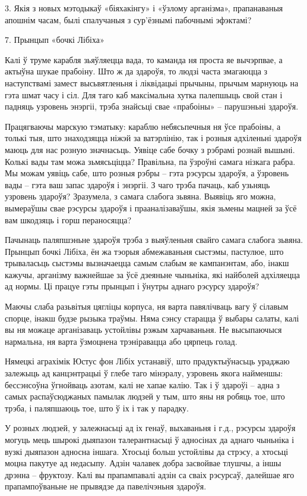 3. Якія з новых мэтодыкаў «біяхакінгу» і «ўзлому арганізма», прапанаваныя апошнім часам, былі спалучаныя з сур'ёзнымі пабочнымі эфэктамі?


7. Прынцып «бочкі Лібіха»

Калі ў труме карабля зьяўляецца вада, то каманда ня проста яе вычэрпвае, а актыўна шукае прабоіну. Што ж да здароўя, то людзі часта змагаюцца з наступствамі замест высьвятленьня і ліквідацыі прычыны, прычым марнуюць на гэта шмат часу і сіл. Для таго каб максімальна хутка палепшыць свой стан і падняць узровень энэргіі, трэба знайсьці свае «прабоіны» – парушэньні здароўя.

Працягваючы марскую тэматыку: караблю небясьпечныя ня ўсе прабоіны, а толькі тыя, што знаходзяцца ніжэй за ватэрлінію, так і розныя адхіленьні здароўя маюць для нас розную значнасьць. Уявіце сабе бочку з рэбрамі рознай вышыні. Колькі вады там можа зьмясьціцца? Правільна, па ўзроўні самага нізкага рабра. Мы можам уявіць сабе, што розныя рэбры – гэта рэсурсы здароўя, а ўзровень вады – гэта ваш запас здароўя і энэргіі. З чаго трэба пачаць, каб узьняць узровень здароўя? Зразумела, з самага слабога зьвяна. Выявіць яго можна, вымераўшы свае рэсурсы здароўя і прааналізаваўшы, якія зьмены мацней за ўсё вам шкодзяць і горш пераносяцца?

Пачынаць паляпшэньне здароўя трэба з выяўленьня свайго самага слабога зьвяна. Прынцып бочкі Лібіха, ён жа тэорыя абмежаваньня сыстэмы, пастулюе, што трываласьць сыстэмы вызначаецца самым слабым яе кампанэнтам, або, інакш кажучы, арганізму важнейшае за ўсё дзеяньне чыньніка, які найболей адхіляецца ад нормы. Ці працуе гэты прынцып і ўнутры аднаго рэсурсу здароўя?

Маючы слаба разьвітыя цягліцы корпуса, ня варта павялічваць вагу ў сілавым спорце, інакш будзе рызыка траўмы. Няма сэнсу старацца ў выбары салаты, калі вы ня можаце арганізаваць устойлівы рэжым харчаваньня. Не высыпаючыся нармальна, ня варта ўзмоцнена трэніравацца або цярпець голад.

Нямецкі аграхімік Юстус фон Лібіх устанавіў, што прадуктыўнасьць ураджаю залежыць ад канцэнтрацыі ў глебе таго мінэралу, узровень якога найменшы: бессэнсоўна ўгнойваць азотам, калі не хапае калію. Так і ў здароўі – адна з самых распаўсюджаных памылак людзей у тым, што яны ня робяць тое, што трэба, і паляпшаюць тое, што ў іх і так у парадку.

У розных людзей, у залежнасьці ад іх генаў, выхаваньня і г.д., рэсурсы здароўя могуць мець шырокі дыяпазон талерантнасьці ў адносінах да аднаго чыньніка і вузкі дыяпазон адносна іншага. Хтосьці больш устойлівы да стрэсу, а хтосьці моцна пакутуе ад недасыпу. Адзін чалавек добра засвойвае тлушчы, а іншы дрэнна – фруктозу. Калі вы прапампавалі адзін са сваіх рэсурсаў, далейшае яго прапампоўваньне не прывядзе да павелічэньня здароўя.

